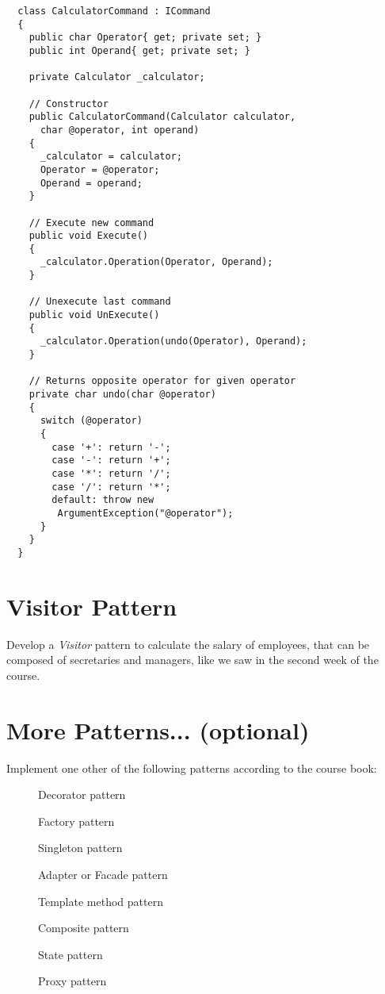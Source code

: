 \documentclass{article}
\begin{document}
 \begin{lstlisting}
  class CalculatorCommand : ICommand
  {
    public char Operator{ get; private set; }
    public int Operand{ get; private set; }

    private Calculator _calculator;
 
    // Constructor
    public CalculatorCommand(Calculator calculator,
      char @operator, int operand)
    {
      _calculator = calculator;
      Operator = @operator;
      Operand = operand;
    }
 
    // Execute new command
    public void Execute()
    {
      _calculator.Operation(Operator, Operand);
    }
 
    // Unexecute last command
    public void UnExecute()
    {
      _calculator.Operation(undo(Operator), Operand);
    }
 
    // Returns opposite operator for given operator
    private char undo(char @operator)
    {
      switch (@operator)
      {
        case '+': return '-';
        case '-': return '+';
        case '*': return '/';
        case '/': return '*';
        default: throw new
         ArgumentException("@operator");
      }
    }
  }
\end{lstlisting}
 



\section{Visitor Pattern}
Develop a \emph{Visitor} pattern to calculate the salary of employees, that
  can be composed of secretaries and managers,
  like we saw in the second week of the course.
  
  \vspace{0.3cm}


\section{More Patterns... (optional)}
Implement one other of the following patterns according to the course book:

    \begin{description}
      \item[] Decorator pattern
      \item[] Factory pattern
      \item[] Singleton pattern
      \item[] Adapter or Facade pattern
      \item[] Template method pattern
      \item[] Composite pattern
      \item[] State pattern
      \item[] Proxy pattern
    \end{description}
\end{document}

